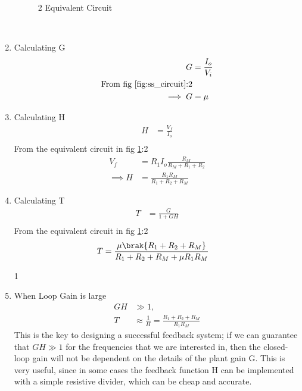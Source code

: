 \begin{enumerate}[label=\thesubsection.\arabic*.,ref=\thesubsection.\theenumi]
\begin{figure}[!ht]
	\begin{center}
		\resizebox{\columnwidth}{!}{}
	\end{center}
\caption{2 Equivalent Circuit}
\label{fig:ss_circuit}
\end{figure}\\
\item
Calculating G\\
\solution
\begin{align}
G &= \frac{I_{o}}{V_{i}} \label{eq:G}\\
\text{From fig \ref{fig:ss_circuit}:2}\\
\implies G&= \mu
\end{align}
\item
Calculating H\\
\solution
\begin{align}
H &= \frac{V_{f}}{I_{o}} \label{eq:H}\\
\end{align}
From the equivalent circuit in fig \ref{fig:ss_circuit}:2\\
\begin{align}
V_{f}&=R_{1}I_{o}\frac{R_M}{R_M+R_1+R_2}\\
\implies
H &= \frac{R_1R_M}{R_1+R_2+R_M}
\end{align}
\item
Calculating T\\
\solution
\begin{align}
T &= \frac{G}{1+GH} \label{eq:T}\\
\end{align}
From the equivalent circuit in fig \ref{fig:ss_circuit}:2
\begin{align}
T&= \frac{\mu \brak{R_1+R_2+R_M}}{R_1+R_2+R_M+ \mu R_1R_M}
\end{align}


\begin{table}[!ht]
\centering

\caption{1}
\label{table: Input_Table}
\end{table}


\item When Loop Gain is large\\
\solution
\begin{align}
GH &\gg 1,
 \\
T &\approx \frac{1}{H}  = \frac{R_1+R_2+R_M}{R_1R_M} 
\end{align}
This is the key to designing a successful feedback system; if we can guarantee that $GH \gg 1$ for the frequencies that we are interested in, then the closed-loop gain will not be dependent on the details of the plant gain G. This is very useful, since in some cases the feedback function H can be implemented with a simple resistive divider, which can be cheap and accurate.

\end{enumerate}
